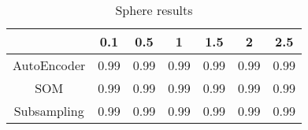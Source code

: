 \begin{table}[h]
    \centering
    \def\arraystretch{1.5}
    \begin{tabular}{|| c | c | c | c | c | c | c ||}
    \hline
         & 0.1 & 0.5 & 1 & 1.5 & 2 & 2.5  \\
    \hline \hline
    AutoEncoder & 0.99 & 0.99 & 0.99 & 0.99 & 0.99 & 0.99 \\ \hline
    SOM & 0.99 & 0.99 & 0.99 & 0.99 & 0.99 & 0.99 \\ \hline
    Subsampling & 0.99 & 0.99 & 0.99 & 0.99 & 0.99 & 0.99 \\ \hline
    \end{tabular}
    \caption{Sphere results}
    \label{tab:sphere_res}
\end{table}